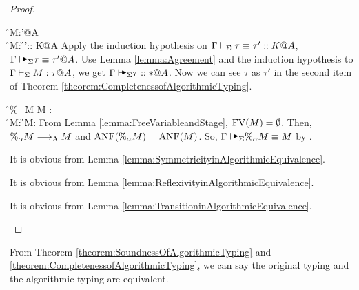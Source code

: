 \begin{proof}
\begin{rneqncase}{\QTApp}
    \end{rneqncase}
    \begin{rneqncase}{\TConv}{
            \G\V M:\tau'@A \\
            \G\V M:\tau@A {}
            \G\V \tau\equiv \tau':: K@A
        }
        Apply the induction hypothesis on \( \Gamma\vdash_\Sigma \tau\equiv \tau':: K@A \), \(
        \G\AVS \tau\equiv \tau' @A \).  Use Lemma \ref{lemma:Agreement} and the
        induction hypothesis to \( \Gamma\vdash_\Sigma M : \tau @A \), we get \( \G\AVS \tau
        :: * @ A \). Now we can see \( \tau \) as \( \tau' \) in the second
        item of Theorem \ref{theorem:CompletenessofAlgorithmicTyping}.
    \end{rneqncase}
    \begin{rneqncase}{\QPercent}{
            \G\V\%_\alpha M \E M : 
             \\
            \G\V M: 
            \G\V M:\tau@A
        }
        From Lemma \ref{lemma:FreeVariableandStage}, \( \text{FV}(M) = \emptyset \). Then, \( \%_\alpha M \longrightarrow_{\text{A}} M \) and \( \text{ANF}(\%_\alpha M) = \text{ANF}(M) \). So, \( \G\AVS\%_\alpha M \E M \) by \QAANF.
    \end{rneqncase}
    \begin{rneqncase}{\QKSym}{}
        It is obvious from Lemma \ref{lemma:SymmetricityinAlgorithmicEquivalence}.
    \end{rneqncase}
    \begin{rneqncase}{\QKRefl}{}
        It is obvious from Lemma \ref{lemma:ReflexivityinAlgorithmicEquivalence}.
    \end{rneqncase}
    \begin{rneqncase}{\QKTrans}{}
        It is obvious from Lemma \ref{lemma:TransitioninAlgorithmicEquivalence}.
    \end{rneqncase}
\end{proof}

From Theorem \ref{theorem:SoundnessOfAlgorithmicTyping} and
\ref{theorem:CompletenessofAlgorithmicTyping}, we can say the original typing
and the algorithmic typing are equivalent.
